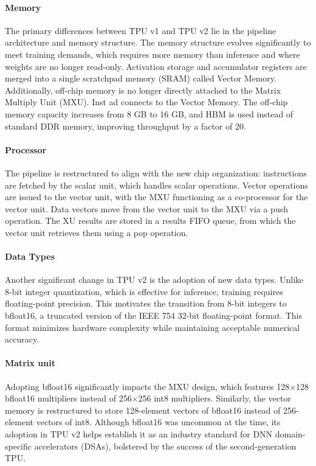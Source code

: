 \documentclass[conference]{IEEEtran}
\begin{document}
\paragraph{Memory}
The primary differences between TPU v1 and TPU v2 lie in the pipeline architecture and memory structure. The memory structure evolves significantly to meet training demands, which requires more memory than inference and where weights are no longer read-only. Activation storage and accumulator registers are merged into a single scratchpad memory (SRAM) called Vector Memory. Additionally, off-chip memory is no longer directly attached to the Matrix Multiply Unit (MXU). Inst ad connects to the Vector Memory.
The off-chip memory capacity increases from 8 GB to 16 GB, and HBM is used instead of standard DDR memory, improving throughput by a factor of 20.

\paragraph{Processor}
The pipeline is restructured to align with the new chip organization: instructions are fetched by the scalar unit, which handles scalar operations. Vector operations are issued to the vector unit, with the MXU functioning as a co-processor for the vector unit. Data vectors move from the vector unit to the MXU via a push operation. The  XU results are stored in a results FIFO queue, from which the vector unit retrieves them using a pop operation.

\paragraph{Data Types}
Another significant change in TPU v2 is the adoption of new data types. Unlike 8-bit integer quantization, which is effective for inference, training requires floating-point precision. This motivates the transition from 8-bit integers to bfloat16, a truncated version of the IEEE 754 32-bit floating-point format.  This format minimizes hardware complexity while maintaining acceptable numerical accuracy.
\paragraph{Matrix unit}
Adopting bfloat16 significantly impacts the MXU design, which features 128×128 bfloat16 multipliers instead of 256×256 int8 multipliers. Similarly, the vector memory is restructured to store 128-element vectors of bfloat16 instead of 256-element vectors of int8. Although bfloat16 was uncommon at the time, its adoption in TPU v2 helps establish it as an industry standard for DNN domain-specific accelerators (DSAs), bolstered by the success of the second-generation TPU.
\end{document}
